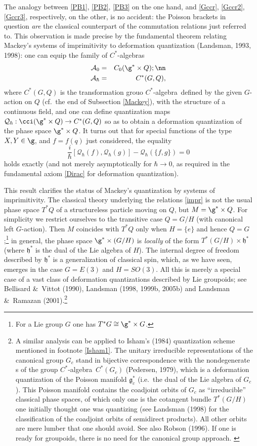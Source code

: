 \documentclass[12pt]{article}
\newcommand{\ca}{$C^*$-algebra} \newcommand{\jba}{JB-algebra}
\newcommand{\irrep}{irreducible representation}
\newcommand{\raw}{\rightarrow} \newcommand{\rat}{\mapsto}
\newcommand{\x}{\times} \newcommand{\hb}{\hbar}
\newcommand{\qh}{q_{\hbar}} \newcommand{\sgh}{\sigma_{\hbar}}
\newcommand{\er}{\eqref}
\newcommand{\h}{\mathfrak{h}}
\newcommand{\CA}{{\mathcal A}} \newcommand{\CB}{{\mathcal B}}
\newcommand{\CQ}{{\mathcal Q}} \newcommand{\CR}{{\mathcal R}}
\renewcommand{\qh}{\CQ_{\hbar}}
\begin{document}
The analogy between \er{PB1}, \er{PB2},  \er{PB3} on the one hand, and  \er{Gccr},  \er{Gccr2},  \er{Gccr3}, respectively, on the other, is no accident: the Poisson brackets in question {\it are} the  classical counterpart  of the commutation relations just referred to. This observation is made precise by the fundamental theorem relating Mackey's systems of imprimitivity to deformation quantization (Landsman, 1993, 1998): one can equip the family of \ca s 
\begin{eqnarray}
\CA_0 &=& C_0(\g^*\times Q); \nn\\
\CA_{\hbar} &=& C^*(G,Q),
\end{eqnarray}
  where $C^*(G,Q)$ is the transformation grouo \ca\ defined by the given $G$-action on $Q$ (cf.\ the end of Subsection \ref{Mackey}), with the structure of a continuous field, and one can define quantization maps $\qh:\cci(\g^*\times Q)\raw C^*(G,Q)$ so as to obtain a deformation quantization of the phase space $\g^*\x Q$. It turns out that for special functions of the type $X,Y\in\g$, and $f=f(q)$ just considered, the equality
  \begin{equation}
\frac{i}{\hbar}[\CQ_{\hbar}(f),\CQ_{\hbar}(g)]-\CQ_{\hbar}(\{f,g\}) =0 \label{Diracexact}
\end{equation}
  holds  exactly (and  not merely asymptotically for $\hbar\raw 0$, as required in the fundamental axiom \er{Dirac} for deformation quantization).
  
 This result clarifies the status of Mackey's quantization by systems of imprimitivity. The classical theory underlying the relations \er{impr} is not the usual phase space $T^*Q$ of a structureless particle moving on $Q$, but $M=\g^*\times Q$. For simplicity we restrict ourselves to the transitive case $Q=G/H$ (with canonical left $G$-action). Then $M$ coincides with $T^*Q$ only when $H=\{e\}$ and hence $Q=G$;\footnote{For a Lie group $G$ one has $T^*G\cong \g^*\x G$.} in general, the phase space $\g^*\times (G/H)$ is {\it locally} of the form $T^*(G/H)\x\h^*$ (where $\h^*$ is the dual of the Lie algebra of $H$). The internal degree of freedom described by $\h^*$ is a generalization of classical spin, which, as we have seen, emerges in the case $G=E(3)$ and $H=SO(3)$. All this is merely a special case of a vast class of deformation quantizations described by Lie groupoids; see Bellisard \&\ Vittot (1990),  Landsman (1998, 1999b, 2005b) and Landsman \&\ Ramazan (2001).\footnote{A similar analysis can be applied to Isham's (1984) quantization scheme mentioned in footnote \ref{Isham1}. The unitary \irrep s of the canonical group $G_c$ stand in bijective correspondence with the nondegenerate \rep s of the group \ca\ $C^*(G_c)$ (Pedersen, 1979), which is a deformation quantization of 
 the Poisson manifold $\mathfrak{g}^*_c$ (i.e.\  the dual  of the Lie algebra of $G_c$).
This Poisson manifold contains the coadjoint orbits of $G_c$ as ``irreducible'' classical phase spaces, of which only one is the cotangent bundle $T^*(G/H)$ one initially thought one was quantizing (see Landsman (1998) for the classification of the coadjoint orbits of semidirect products). All other orbits are mere lumber that one should avoid. See also Robson (1996). If one is ready for groupoids, there is no need for the canonical group approach. \label{Isham2}}
\end{document}

